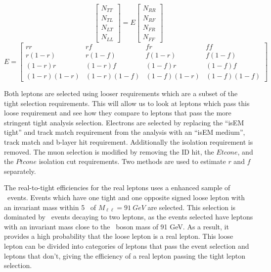 \begin{equation}\label{EQN-MATRIXMETHOD}
\begin{bmatrix}N_{TT}\\N_{TL}\\N_{LT}\\N_{LL}\end{bmatrix} = E\begin{bmatrix}N_{RR}\\N_{RF}\\N_{FR}\\N_{FF}\end{bmatrix}
\end{equation}
\begin{equation}\label{EQN-MATRIXMETHODMATRIX}
E=\begin{bmatrix}rr& rf& fr& ff\\ r(1-r)& r(1-f)& f(1-r)& f(1-f)\\ (1-r)r& (1-r)f& (1-f)r& (1-f)f\\ (1-r)(1-r)& (1-r)(1-f)& (1-f)(1-r)& (1-f)(1-f)\end{bmatrix}
\end{equation}

\noindent
Both leptons are selected using looser requirements which are a subset of the tight selection requirements. This will allow us to look at leptons which pass this loose requirement and see how they compare to leptons that pass the more stringent tight analysis selection. Electrons are selected by replacing the ``isEM tight'' and track match requirement from the analysis with an ``isEM medium'', track match and b-layer hit requirement. Additionally the isolation requirement is removed. The muon selection is modified by removing the ID hit, the $Etcone$, and the $Ptcone$ isolation cut requirements. Two methods are used to estimate $r$ and $f$ separately.

The real-to-tight efficiencies for the real leptons uses a enhanced sample of \Zjets\ events. Events which have one tight and one opposite signed loose lepton with an invariant mass within 5 \GeV\ of $M_{\ell\ell} = 91\ GeV$ are selected. This selection is dominated by \Zjets\ events decaying to two leptons, as the events selected have leptons with an invariant mass close to the \Zboson\ boson mass of 91 GeV. As a result, it provides a high probability that the loose lepton is a real lepton. This loose lepton can be divided into categories of leptons that pass the event selection and leptons that don't, giving the efficiency of a real lepton passing the tight lepton selection. 

